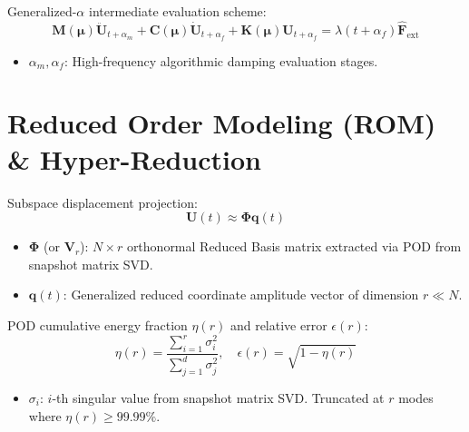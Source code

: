 \documentclass[12pt,a4paper,oneside]{report}
\newcommand{\vect}[1]{\mathbf{#1}}
\newcommand{\mat}[1]{\mathbf{#1}}
\begin{document}
Generalized-$\alpha$ intermediate evaluation scheme:
\begin{equation}
    \hat{\mathbf{M}}(\boldsymbol{\mu}) \ddot{\vect{U}}_{t+\alpha_m} + \mat{C}(\boldsymbol{\mu}) \dot{\vect{U}}_{t+\alpha_f} + \mat{K}(\boldsymbol{\mu}) \vect{U}_{t+\alpha_f} = \lambda(t+\alpha_f) \hat{\mathbf{F}}_{\text{ext}}
\end{equation}
\begin{tcolorbox}[colback=gray!5!white,colframe=gray!60!black,title={Term Definitions \& Parameter Dependencies}]
\begin{itemize}
    \item $\alpha_m, \alpha_f$: High-frequency algorithmic damping evaluation stages.
\end{itemize}
\end{tcolorbox}


\chapter{Reduced Order Modeling (ROM) \& Hyper-Reduction}
\label{ch:rom}

Subspace displacement projection:
\begin{equation}
    \vect{U}(t) \approx \boldsymbol{\Phi} \vect{q}(t)
\end{equation}
\begin{tcolorbox}[colback=gray!5!white,colframe=gray!60!black,title={Term Definitions \& Parameter Dependencies}]
\begin{itemize}
    \item $\boldsymbol{\Phi}$ (or $\mat{V}_r$): $N \times r$ orthonormal Reduced Basis matrix extracted via POD from snapshot matrix SVD.
    \item $\vect{q}(t)$: Generalized reduced coordinate amplitude vector of dimension $r \ll N$.
\end{itemize}
\end{tcolorbox}

POD cumulative energy fraction $\eta(r)$ and relative error $\epsilon(r)$:
\begin{equation}
    \eta(r) = \frac{\sum_{i=1}^{r} \sigma_i^2}{\sum_{j=1}^{d} \sigma_j^2}, \quad \epsilon(r) = \sqrt{1 - \eta(r)}
\end{equation}
\begin{tcolorbox}[colback=gray!5!white,colframe=gray!60!black,title={Term Definitions \& Parameter Dependencies}]
\begin{itemize}
    \item $\sigma_i$: $i$-th singular value from snapshot matrix SVD. Truncated at $r$ modes where $\eta(r) \ge 99.99\%$.
\end{itemize}
\end{tcolorbox}
\end{document}
